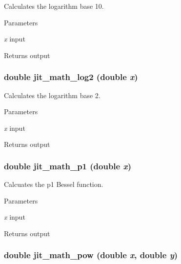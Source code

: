 Calculates the logarithm base 10. 
\begin{DoxyParams}{Parameters}
\item[{\em x}]input \end{DoxyParams}
\begin{DoxyReturn}{Returns}
output 
\end{DoxyReturn}
\hypertarget{group__mathmod_gaf5c2224b71ae0c70dbbf1f16b09ddf21}{
\subsubsection[{jit\_\-math\_\-log2}]{\setlength{\rightskip}{0pt plus 5cm}double jit\_\-math\_\-log2 (double {\em x})}}
\label{group__mathmod_gaf5c2224b71ae0c70dbbf1f16b09ddf21}


Calculates the logarithm base 2. 
\begin{DoxyParams}{Parameters}
\item[{\em x}]input \end{DoxyParams}
\begin{DoxyReturn}{Returns}
output 
\end{DoxyReturn}
\hypertarget{group__mathmod_ga8cbec53c20ed586044eac91540c7432e}{
\subsubsection[{jit\_\-math\_\-p1}]{\setlength{\rightskip}{0pt plus 5cm}double jit\_\-math\_\-p1 (double {\em x})}}
\label{group__mathmod_ga8cbec53c20ed586044eac91540c7432e}


Calcuates the p1 Bessel function. 
\begin{DoxyParams}{Parameters}
\item[{\em x}]input \end{DoxyParams}
\begin{DoxyReturn}{Returns}
output 
\end{DoxyReturn}
\hypertarget{group__mathmod_ga2af7bdac7c3e46f8824c929b9f6c7ca5}{
\subsubsection[{jit\_\-math\_\-pow}]{\setlength{\rightskip}{0pt plus 5cm}double jit\_\-math\_\-pow (double {\em x}, \/  double {\em y})}}
\label{group__mathmod_ga2af7bdac7c3e46f8824c929b9f6c7ca5}


